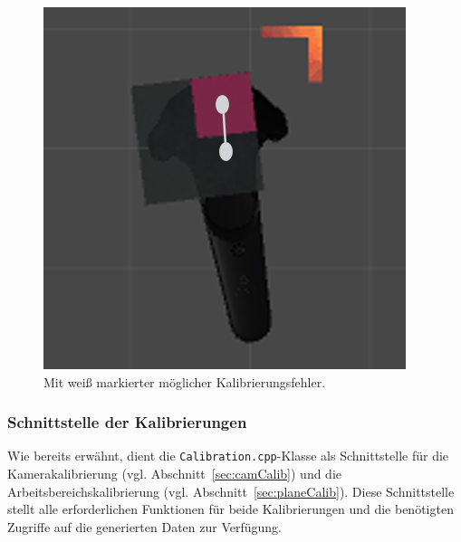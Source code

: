 \begin{figure}
	\centering
	\includegraphics[scale=0.6]{Bilder/Neue Screenshots/Kalibrierungsfehler_OR-KLEIN.jpg}
	\caption[Kalibrierungsfehler]{Mit weiß markierter möglicher Kalibrierungsfehler.}
	\label{fig:markierterFehler}
\end{figure}



\subsubsection{Schnittstelle der Kalibrierungen} \label{sec:CalibSteuerung}
Wie bereits erwähnt, dient die \texttt{Calibration.cpp}-Klasse als Schnittstelle für die Kamerakalibrierung (vgl. Abschnitt~\ref{sec:camCalib}) und die Arbeitsbereichskalibrierung (vgl. Abschnitt~\ref{sec:planeCalib}). Diese Schnittstelle stellt alle erforderlichen Funktionen für beide Kalibrierungen und die benötigten Zugriffe auf die generierten Daten zur Verfügung. 

